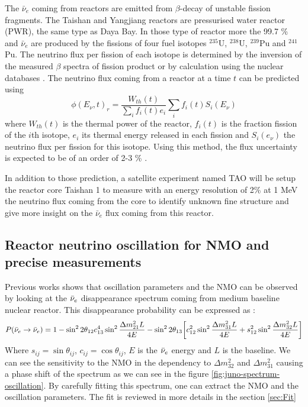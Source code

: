 The $\bar{\nu}_e$ coming from reactors are emitted from $\beta$-decay of unstable fission fragments. The Taishan and Yangjiang reactors are pressurised water reactor (PWR), the same type as Daya Bay. In those type of reactor more the 99.7 \% and $\bar{\nu}_e$ are produced by the fissions of four fuel isotopes $^{235}$U, $^{238}$U, $^{239}$Pu and $^{241}$Pu. The neutrino flux per fission of each isotope is determined by the inversion of the measured $\beta$ spectra of fission product \cite{hahn_antineutrino_1989, mueller_improved_2011, von_feilitzsch_experimental_1982, schreckenbach_determination_1985, huber_determination_2011} or by calculation using the nuclear databases \cite{vogel_reactor_1981, dwyer_spectral_2015}. The neutrino flux coming from a reactor at a time $t$ can be predicted using
\begin{equation}
  \phi(E_\nu, t)_r = \frac{W_{th}(t)}{\sum_i f_i(t) e_i} \sum_i f_i(t) S_i(E_\nu)
\end{equation}
where $W_{th}(t)$ is the thermal power of the reactor, $f_i(t)$ is the fraction fission of the $i$th isotope, $e_i$ its thermal energy released in each fission and $S_i(e_\nu)$ the neutrino flux per fission for this isotope. Using this method, the flux uncertainty is expected to be of an order of 2-3 \% \cite{juno_collaboration_sub-percent_2022}.

In addition to those prediction, a satellite experiment named TAO\cite{steiger_tao_2022} will be setup the reactor core Taishan 1 to measure with an energy resolution of 2\% at 1 MeV the neutrino flux coming from the core to identify unknown fine structure and give more insight on the $\bar{\nu}_e$ flux coming from this reactor.

\subsection{Reactor neutrino oscillation for NMO and precise measurements}

Previous works \cite{zhan_determination_2008,  zhan_experimental_2009} shows that oscillation parameters and the NMO can be observed by looking at the $\bar{\nu}_{e}$ disappearance spectrum coming from medium baseline nuclear reactor. This disappearance probability can be expressed as \cite{an_neutrino_2016} :
\begin{equation*}
  P(\bar{\nu}_{e} \rightarrow \bar{\nu}_{e}) = 1 - \sin^2 2\theta_{12} c^4_{13} \sin^2 \frac{\Delta m^2_{21}L}{4E} - \sin^2 2\theta_{13} \bigg[ c_{12}^2 \sin^2 \frac{\Delta m_{31}^2 L}{4E} + s^2_{12} \sin^2 \frac{\Delta m_{32}^2 L}{4E} \bigg]
\end{equation*}
Where $s_{ij} = \sin \theta_{ij}$, $c_{ij} = \cos \theta_{ij}$, $E$ is the $\bar{\nu}_{e}$ energy and $L$ is the baseline.
We can see the sensitivity to the NMO in the dependency to $\Delta m_{32}^2$ and $\Delta m^2_{31}$ causing a phase shift of the spectrum as we can see in the figure \ref{fig:juno-spectrum-oscillation}.
By carefully fitting this spectrum, one can extract the NMO and the oscillation parameters. The fit is reviewed in more details in the section \ref{sec:Fit}

